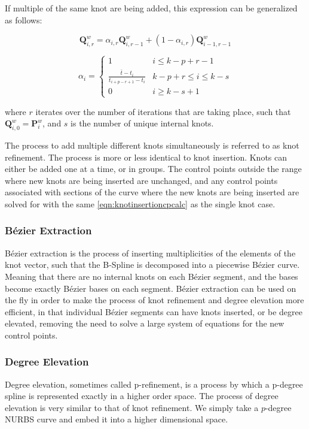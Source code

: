 
If multiple of the same knot are being added, this expression can be generalized as follows:

\begin{equation}
\label{eqn:genknotinsertioncpcalc}
\mathbf{Q}_{i,r}^w = \alpha_{i,r} \mathbf{Q}_{i,r-1}^w + (1-\alpha_{i,r})\mathbf{Q}_{i-1,r-1}^w
\end{equation}

\[
\alpha_i = 
\begin{cases}
1 & i\leq k-p+r-1\\
\frac{\bar{t}-t_i}{t_{i+p-r+1} - t_i} & k-p+r \leq i \leq k-s\\
0 & i \geq k-s+1
\end{cases}
\]

where $r$ iterates over the number of iterations that are taking place, such that \(\mathbf{Q}_{i,0}^w = \mathbf{P}_{i}^w\), and $s$ is the number of unique internal knots.

The process to add multiple different knots simultaneously is referred to as knot refinement.  The process is more or less identical to knot insertion. Knots can either be added one at a time, or in groups. The control points outside the range where new knots are being inserted are unchanged, and any control points associated with sections of the curve where the new knots are being inserted are solved for with the same \cref{eqn:knotinsertioncpcalc} as the single knot case. 

\subsubsection{Bézier Extraction}
Bézier extraction is the process of inserting multiplicities of the elements of the knot vector, such that the B-Spline is decomposed into a piecewise Bézier curve. Meaning that there are no internal knots on each Bézier segment, and the bases become exactly Bézier bases on each segment. Bézier extraction can be used on the fly in order to make the process of knot refinement and degree elevation more efficient, in that individual Bézier segments can have knots inserted, or be degree elevated, removing the need to solve a large system of equations for the new control points.

\subsubsection{Degree Elevation}
Degree elevation, sometimes called p-refinement, is a process by which a p-degree spline is represented exactly in a higher order space. The process of degree elevation is very similar to that of knot refinement. We simply take a $p$-degree NURBS curve and embed it into a higher dimensional space.

